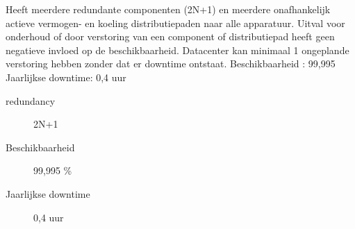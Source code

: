 Heeft meerdere redundante componenten (2N+1) en meerdere onafhankelijk actieve vermogen- en koeling distributiepaden naar alle apparatuur. Uitval voor onderhoud of door verstoring van een component of distributiepad heeft geen negatieve invloed op de beschikbaarheid. Datacenter kan minimaal 1 ongeplande verstoring hebben zonder dat er downtime ontstaat.
Beschikbaarheid : 99,995%
Jaarlijkse downtime: 0,4 uur
\begin{description}
\item[redundancy] 2N+1
\item[Beschikbaarheid] 99,995 \%
\item[Jaarlijkse downtime] 0,4 uur
\end{description}
